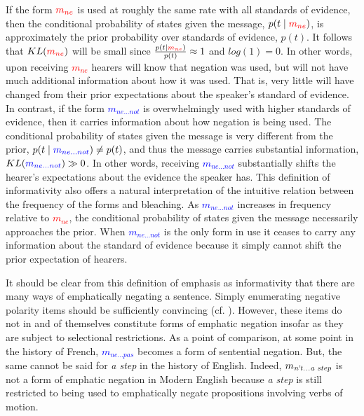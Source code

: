 \documentclass[linguex]{sp}
\theoremstyle{definition} \newtheorem{definition}{Definition}
\begin{document}
If the form $\textcolor{red}{m_{ne}}$ is used at roughly the same rate with all standards of evidence, then the conditional probability of states given the message, $p(t \mid \textcolor{red}{m_{ne}})$, is approximately the prior probability over standards of evidence, $p(t)$. It follows that $KL(\textcolor{red}{m_{ne}})$ will be small since $\frac{p(t \mid \textcolor{red}{m_{ne}})}{p(t)} \approx 1$ and $log(1) = 0$. In other words, upon receiving \textcolor{red}{$m_{ne}$} hearers will know that negation was used, but will not have much additional information about how it was used. That is, very little will have changed from their prior expectations about the speaker's standard of evidence.  In contrast, if the form \textcolor{blue}{$m_{ne...not}$} is overwhelmingly used with higher standards of evidence, then it carries information about how negation is being used. The conditional probability of states given the message is very different from the prior, $p(t \mid \textcolor{blue}{m_{ne...not}}) \neq p(t)$, and thus the message carries substantial information, $KL(\textcolor{blue}{m_{ne...not}}) \gg 0$.  In other words, receiving \textcolor{blue}{$m_{ne...not}$} substantially shifts the hearer's expectations about the evidence the speaker has.   This definition of informativity also offers a natural interpretation of the intuitive relation between the frequency of the forms and bleaching. As \textcolor{blue}{$m_{ne...not}$} increases in frequency relative to \textcolor{red}{$m_{ne}$}, the conditional probability of states given the message necessarily approaches the prior. When \textcolor{blue}{$m_{ne...not}$} is the only form in use it ceases to carry any information about the standard of evidence because it simply cannot shift the prior expectation of hearers.

It should be clear from this definition of emphasis as informativity that there are many ways of emphatically negating a sentence. Simply enumerating negative polarity items should be sufficiently convincing (cf. \citealt{horn:1989}). However, these items do not in and of themselves constitute forms of emphatic negation insofar as they are subject to selectional restrictions. As a point of comparison, at some point in the history of French, \textcolor{blue}{$m_{ne...pas}$}  becomes a form of sentential negation. But, the same cannot be said for \emph{a step} in the history of English. Indeed, \textcolor{blue}{$m_{\text{\emph{n't...a step}}}$} is not a form of emphatic negation in Modern English because \emph{a step} is still restricted to being used to emphatically negate propositions involving verbs of motion.
\end{document}
